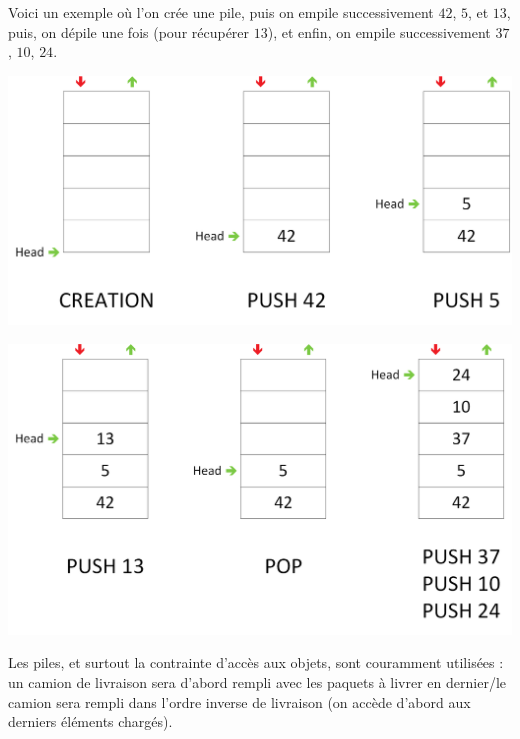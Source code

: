 \documentclass[11pt,a4paper]{article}
\begin{document}
Voici un exemple où l'on crée une pile, puis on empile successivement $ 42 $, $ 5 $, et $ 13 $, puis, on dépile une fois (pour récupérer $ 13 $), et enfin, on empile successivement $ 37 $, $ 10 $, $ 24 $.\\

\vfillFirst

\begin{center}
\includegraphics[scale=0.5]{img/piles/Piles_2_Structure_Generale_Usage_pack_1.png}
\end{center}

\vfillLast

\pagebreak

\begin{center}
\includegraphics[scale=0.5]{img/piles/Piles_2_Structure_Generale_Usage_pack_2.png}
\end{center}

\smallskip

Les piles, et surtout la contrainte d'accès aux objets, sont couramment utilisées : un camion de livraison sera d'abord rempli avec les paquets à livrer en dernier/le camion sera rempli dans l'ordre inverse de livraison (on accède d'abord aux derniers éléments chargés).
\end{document}
